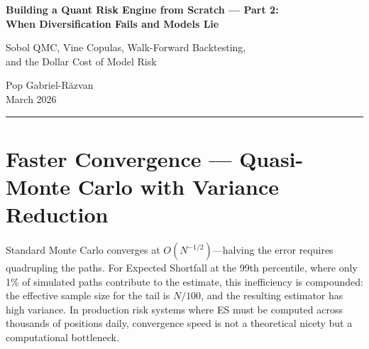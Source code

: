 \documentclass[11pt,a4paper]{article}
\begin{document}
\begin{center}
    {\LARGE\bfseries\color{accentblue} Building a Quant Risk Engine from Scratch --- Part 2:\\[4pt]
    When Diversification Fails and Models Lie}

    \vspace{0.6em}
    {\large Sobol QMC, Vine Copulas, Walk-Forward Backtesting,\\
    and the Dollar Cost of Model Risk}

    \vspace{1em}
    {\large Pop Gabriel-R\u{a}zvan}\\[4pt]
    {\normalsize March 2026}
\end{center}

\vspace{0.5em}

\begin{abstract}
\noindent
In Part~1, we built a stochastic volatility simulation engine and showed that Expected Shortfall estimates diverge by 30\% across volatility models. Part~2 puts this engine to work. We demonstrate 191$\times$ convergence improvement via Sobol quasi-Monte Carlo, show that equity tail dependence jumps from 0.01 to 0.49 during crises using vine copulas, validate on 1{,}053 days of real market data where Heston passes Basel traffic-light tests that GBM fails, and quantify that a Black--Scholes hedger underestimates tail losses by 6--12$\times$ under realistic stochastic volatility. An interactive dashboard is available at \url{https://quantriskeng.streamlit.app}.
\end{abstract}

\vspace{0.3em}
\hrule
\vspace{1em}

\section{Faster Convergence --- Quasi-Monte Carlo with Variance Reduction}

Standard Monte Carlo converges at $O(N^{-1/2})$---halving the error requires quadrupling the paths. For Expected Shortfall at the 99th percentile, where only 1\% of simulated paths contribute to the estimate, this inefficiency is compounded: the effective sample size for the tail is $N/100$, and the resulting estimator has high variance. In production risk systems where ES must be computed across thousands of positions daily, convergence speed is not a theoretical nicety but a computational bottleneck.
\end{document}
